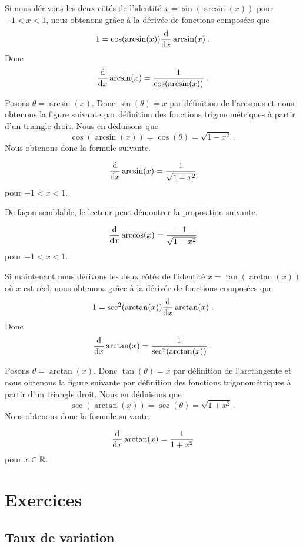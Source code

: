 {Si nous dérivons les deux côtés de l'identité $x = \sin (\arcsin(x))$ pour
$-1 < x < 1$, nous obtenons grâce à la dérivée de fonctions composées que
\[
1 = \cos(\arcsin(x)) \dfdx{\arcsin(x)}{x} \; .
\]
Donc
\[
\dfdx{\arcsin(x)}{x} = \frac{1}{\cos(\arcsin(x))} \; .
\]

Posons $\theta = \arcsin(x)$.  Donc $\sin(\theta) = x$ par définition
de l'arcsinus et nous obtenons la figure suivante par définition des
fonctions trigonométriques à partir d'un triangle droit.
Nous en déduisons que
\[
\cos(\arcsin(x)) = \cos(\theta) = \sqrt{1-x^2} \; .
\]
Nous obtenons donc la formule suivante.

\begin{prop}
\[
\dfdx{\arcsin(x)}{x} = \frac{1}{\sqrt{1-x^2}}
\]
pour $-1<x<1$.
\end{prop}

De façon semblable, le lecteur peut démontrer la proposition suivante.

\begin{prop}
\[
\dfdx{\arccos(x)}{x} = \frac{-1}{\sqrt{1-x^2}}
\]
pour $-1<x<1$.
\end{prop}

Si maintenant nous dérivons les deux côtés de l'identité
$x = \tan (\arctan(x))$
où $x$ est réel, nous obtenons grâce à la dérivée de fonctions composées que
\[
1 = \sec^2(\arctan(x)) \dfdx{\arctan(x)}{x}\; .
\]
Donc
\[
\dfdx{\arctan(x)}{x} = \frac{1}{\sec^2(\arctan(x))} \; .
\]

Posons $\theta = \arctan(x)$.  Donc $\tan(\theta) = x$ par définition
de l'arctangente et nous obtenons la figure suivante par définition des
fonctions trigonométriques à partir d'un triangle droit.
Nous en déduisons que
\[
\sec(\arctan(x)) = \sec(\theta) = \sqrt{1+x^2} \ .
\]
Nous obtenons donc la formule suivante.

\begin{prop}
\[
\dfdx{\arctan(x)}{x} = \frac{1}{1+x^2}
\]
pour $x\in \RR$.
\end{prop}

}  %

\section{Exercices}

\subsection{Taux de variation}

